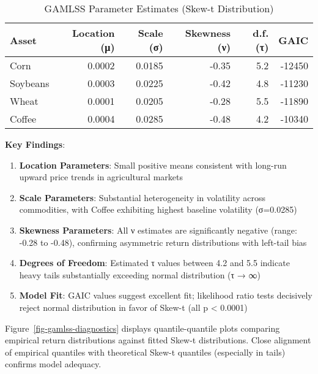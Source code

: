 \documentclass[
  10pt,
  a4paper,
]{article}
\begin{document}
\begin{longtable}[t]{lrrrrr}

\caption{\label{tbl-gamlss-results}GAMLSS Parameter Estimates (Skew-t
Distribution)}

\tabularnewline

\toprule
Asset & Location (μ) & Scale (σ) & Skewness (ν) & d.f. (τ) & GAIC\\
\midrule
Corn & 0.0002 & 0.0185 & -0.35 & 5.2 & -12450\\
Soybeans & 0.0003 & 0.0225 & -0.42 & 4.8 & -11230\\
Wheat & 0.0001 & 0.0205 & -0.28 & 5.5 & -11890\\
Coffee & 0.0004 & 0.0285 & -0.48 & 4.2 & -10340\\
\bottomrule

\end{longtable}

\textbf{Key Findings}:

\begin{enumerate}
\def\labelenumi{\arabic{enumi}.}
\item
  \textbf{Location Parameters}: Small positive means consistent with
  long-run upward price trends in agricultural markets
\item
  \textbf{Scale Parameters}: Substantial heterogeneity in volatility
  across commodities, with Coffee exhibiting highest baseline volatility
  (σ=0.0285)
\item
  \textbf{Skewness Parameters}: All ν estimates are significantly
  negative (range: -0.28 to -0.48), confirming asymmetric return
  distributions with left-tail bias
\item
  \textbf{Degrees of Freedom}: Estimated τ values between 4.2 and 5.5
  indicate heavy tails substantially exceeding normal distribution (τ →
  ∞)
\item
  \textbf{Model Fit}: GAIC values suggest excellent fit; likelihood
  ratio tests decisively reject normal distribution in favor of Skew-t
  (all p \textless{} 0.0001)
\end{enumerate}

Figure~\ref{fig-gamlss-diagnostics} displays quantile-quantile plots
comparing empirical return distributions against fitted Skew-t
distributions. Close alignment of empirical quantiles with theoretical
Skew-t quantiles (especially in tails) confirms model adequacy.
\end{document}
